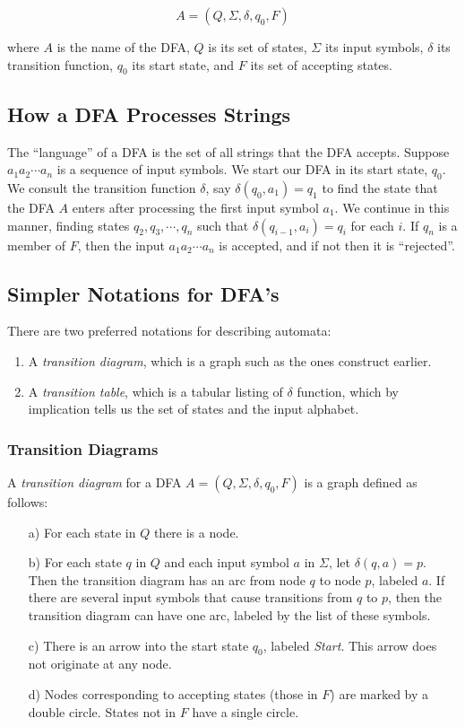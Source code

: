 \documentclass[]{article}
\begin{document}
      \[ A = (Q, \Sigma, \delta, q_0, F) \]
      
    where $A$ is the name of the DFA, $Q$ is its set of states, $\Sigma$ its
    input symbols, $\delta$ its transition function, $q_0$ its start state,
    and $F$ its set of accepting states.
    
  \subsection*{How a DFA Processes Strings}
    The ``language'' of a DFA is the set of all strings that the DFA accepts.
    Suppose $a_{1}a_{2}\cdots a_n$ is a sequence of input symbols. We start
    our DFA in its start state, $q_0$. We consult the transition function
    $\delta$, say $\delta(q_0, a_1) = q_1$ to find the state that the DFA $A$
    enters after processing the first input symbol $a_1$. We continue in this
    manner, finding states $q_2,q_3,\cdots,q_n$ such that $\delta(q_{i-1}, 
    a_i) = q_i$ for each $i$. If $q_n$ is a member of $F$, then the input
    $a_{1}a_{2}\cdots a_n$ is accepted, and if not then it is ``rejected''.
    
  \subsection*{Simpler Notations for DFA's}
    There are two preferred notations for describing automata:
    \begin{enumerate}
      \item A \emph{transition diagram}, which is a graph such as the ones 
      construct earlier.
      \item A \emph{transition table}, which is a tabular listing of $\delta$
      function, which by implication tells us the set of states and the input
      alphabet.
    \end{enumerate}
    
    \subsubsection*{Transition Diagrams}
      A \emph{transition diagram} for a DFA $A = (Q, \Sigma, \delta, q_0, F)$
      is a graph defined as follows:
      \begin{enumerate}
        \item[a)] For each state in $Q$ there is a node.
        \item[b)] For each state $q$ in $Q$ and each input symbol $a$ in $
        \Sigma$, let $\delta(q, a) = p.$ Then the transition diagram has an 
        arc from node $q$ to node $p$, labeled $a$. If there are several input 
        symbols that cause transitions from $q$ to $p$, then the transition 
        diagram can have one arc, labeled by the list of these symbols.
        \item[c)] There is an arrow into the start state $q_0$, labeled 
        \emph{Start}. This arrow does not originate at any node.
        \item[d)] Nodes corresponding to accepting states (those in $F$) are 
        marked by a double circle. States not in $F$ have a single circle.
      \end{enumerate}
    
\end{document}
